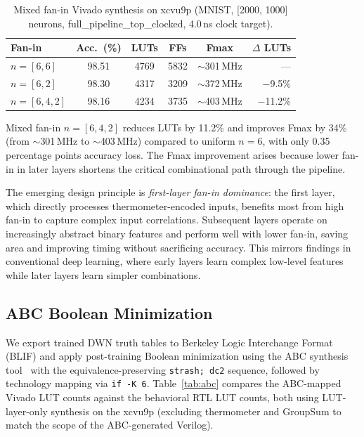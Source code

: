 \documentclass[conference]{IEEEtran}
\begin{document}
\begin{table}[t]
\centering
\caption{Mixed fan-in Vivado synthesis on xcvu9p (MNIST, [2000, 1000] neurons, full\_pipeline\_top\_clocked, 4.0\,ns clock target).}
\label{tab:mixed_mnist}
\begin{tabular}{@{}lccccr@{}}
\toprule
\textbf{Fan-in} & \textbf{Acc.\ (\%)} & \textbf{LUTs} & \textbf{FFs} & \textbf{Fmax} & \textbf{$\Delta$ LUTs} \\
\midrule
$n{=}[6,6]$   & 98.51 & \num{4769} & \num{5832} & ${\sim}$301\,MHz & --- \\
$n{=}[6,2]$   & 98.30 & \num{4317} & \num{3209} & ${\sim}$372\,MHz & $-$9.5\% \\
$n{=}[6,4,2]$ & 98.16 & \num{4234} & \num{3735} & ${\sim}$403\,MHz & $-$11.2\% \\
\bottomrule
\end{tabular}
\end{table}

Mixed fan-in $n{=}[6,4,2]$ reduces LUTs by 11.2\% and improves Fmax by 34\% (from ${\sim}$301\,MHz to ${\sim}$403\,MHz) compared to uniform $n{=}6$, with only 0.35 percentage points accuracy loss.
The Fmax improvement arises because lower fan-in in later layers shortens the critical combinational path through the pipeline.

The emerging design principle is \emph{first-layer fan-in dominance}: the first layer, which directly processes thermometer-encoded inputs, benefits most from high fan-in to capture complex input correlations.
Subsequent layers operate on increasingly abstract binary features and perform well with lower fan-in, saving area and improving timing without sacrificing accuracy.
This mirrors findings in conventional deep learning, where early layers learn complex low-level features while later layers learn simpler combinations.

\subsection{ABC Boolean Minimization}
\label{sec:abc}

We export trained DWN truth tables to Berkeley Logic Interchange Format (BLIF) and apply post-training Boolean minimization using the ABC synthesis tool~\cite{brayton2010abc} with the equivalence-preserving \texttt{strash; dc2} sequence, followed by technology mapping via \texttt{if -K 6}.
Table~\ref{tab:abc} compares the ABC-mapped Vivado LUT counts against the behavioral RTL LUT counts, both using LUT-layer-only synthesis on the xcvu9p (excluding thermometer and GroupSum to match the scope of the ABC-generated Verilog).
\end{document}
